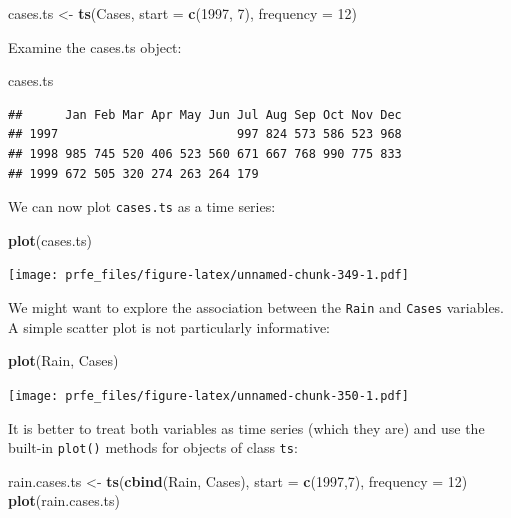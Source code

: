 \documentclass[12pt,a4paper]{book}
\newenvironment{Shaded}{\begin{snugshade}}{\end{snugshade}}
\newcommand{\DataTypeTok}[1]{\textcolor[rgb]{0.13,0.29,0.53}{#1}}
\newcommand{\DecValTok}[1]{\textcolor[rgb]{0.00,0.00,0.81}{#1}}
\newcommand{\KeywordTok}[1]{\textcolor[rgb]{0.13,0.29,0.53}{\textbf{#1}}}
\newcommand{\NormalTok}[1]{#1}
\newcommand{\StringTok}[1]{\textcolor[rgb]{0.31,0.60,0.02}{#1}}
\theoremstyle{definition}
\theoremstyle{definition}
\theoremstyle{definition}
\theoremstyle{remark}
\begin{document}
\begin{Shaded}
\begin{Highlighting}[]
\NormalTok{cases.ts <-}\StringTok{ }\KeywordTok{ts}\NormalTok{(Cases, }\DataTypeTok{start =} \KeywordTok{c}\NormalTok{(}\DecValTok{1997}\NormalTok{, }\DecValTok{7}\NormalTok{), }\DataTypeTok{frequency =} \DecValTok{12}\NormalTok{)}
\end{Highlighting}
\end{Shaded}

Examine the cases.ts object:

\begin{Shaded}
\begin{Highlighting}[]
\NormalTok{cases.ts}
\end{Highlighting}
\end{Shaded}

\begin{verbatim}
##      Jan Feb Mar Apr May Jun Jul Aug Sep Oct Nov Dec
## 1997                         997 824 573 586 523 968
## 1998 985 745 520 406 523 560 671 667 768 990 775 833
## 1999 672 505 320 274 263 264 179
\end{verbatim}

We can now plot \texttt{cases.ts} as a time series:

\begin{Shaded}
\begin{Highlighting}[]
\KeywordTok{plot}\NormalTok{(cases.ts)}
\end{Highlighting}
\end{Shaded}

\texttt{[image: prfe\_files/figure-latex/unnamed-chunk-349-1.pdf]}

We might want to explore the association between the \texttt{Rain} and
\texttt{Cases} variables. A simple scatter plot is not particularly
informative:

\begin{Shaded}
\begin{Highlighting}[]
\KeywordTok{plot}\NormalTok{(Rain, Cases)}
\end{Highlighting}
\end{Shaded}

\texttt{[image: prfe\_files/figure-latex/unnamed-chunk-350-1.pdf]}

It is better to treat both variables as time series (which they are) and
use the built-in \texttt{plot()} methods for objects of class
\texttt{ts}:

\begin{Shaded}
\begin{Highlighting}[]
\NormalTok{rain.cases.ts <-}\StringTok{ }\KeywordTok{ts}\NormalTok{(}\KeywordTok{cbind}\NormalTok{(Rain, Cases), }\DataTypeTok{start =} \KeywordTok{c}\NormalTok{(}\DecValTok{1997}\NormalTok{,}\DecValTok{7}\NormalTok{), }\DataTypeTok{frequency =} \DecValTok{12}\NormalTok{)}
\KeywordTok{plot}\NormalTok{(rain.cases.ts)}
\end{Highlighting}
\end{Shaded}
\end{document}
